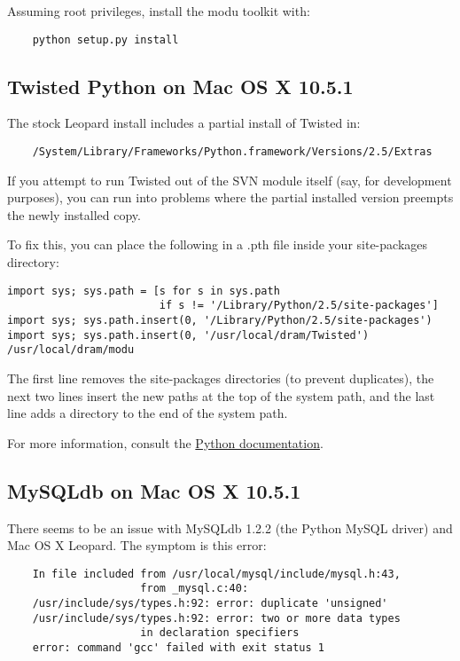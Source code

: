Assuming root privileges, install the modu toolkit with:

\begin{verbatim}
    python setup.py install
\end{verbatim}

\subsection{Twisted Python on Mac OS X 10.5.1}

The stock Leopard install includes a partial install of Twisted in:
\begin{verbatim}
    /System/Library/Frameworks/Python.framework/Versions/2.5/Extras
\end{verbatim}
If you attempt to run Twisted out of the SVN module itself (say, for development
purposes), you can run into problems where the partial installed version preempts
the newly installed copy.

To fix this, you can place the following in a .pth file inside your site-packages directory:

\begin{verbatim}
import sys; sys.path = [s for s in sys.path 
                        if s != '/Library/Python/2.5/site-packages']
import sys; sys.path.insert(0, '/Library/Python/2.5/site-packages')
import sys; sys.path.insert(0, '/usr/local/dram/Twisted')
/usr/local/dram/modu
\end{verbatim}

The first line removes the site-packages directories (to prevent duplicates),
the next two lines insert the new paths at the top of the system path, and the
last line adds a directory to the end of the system path.

For more information, consult the \href{http://docs.python.org/lib/module-site.html}{Python documentation}.


\subsection{MySQLdb on Mac OS X 10.5.1}

There seems to be an issue with MySQLdb 1.2.2 (the Python MySQL driver) and
Mac OS X Leopard. The symptom is this error:

\begin{verbatim}
    In file included from /usr/local/mysql/include/mysql.h:43,
                     from _mysql.c:40:
    /usr/include/sys/types.h:92: error: duplicate 'unsigned'
    /usr/include/sys/types.h:92: error: two or more data types
                     in declaration specifiers
    error: command 'gcc' failed with exit status 1
\end{verbatim}

